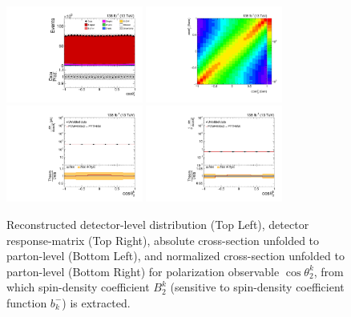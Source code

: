 \clearpage
\begin{figure}[htb]
\begin{center}
 \includegraphics[width=0.40\textwidth]{fig_fullRun2UL/controlplots/combined/Hyp_LeptonBk.pdf}
 \includegraphics[width=0.40\textwidth]{fig_fullRun2UL/unfolding/combined/ResponseMatrix_b2k.pdf} \\
 \includegraphics[width=0.40\textwidth]{fig_fullRun2UL/unfolding/combined/UnfoldedResults_b2k.pdf}
 \includegraphics[width=0.40\textwidth]{fig_fullRun2UL/unfolding/combined/UnfoldedResultsNorm_b2k.pdf} \\
\label{fig:b2k}
\caption{Reconstructed detector-level distribution (Top Left), detector response-matrix (Top Right), absolute cross-section unfolded to parton-level (Bottom Left), and normalized cross-section unfolded to parton-level (Bottom Right) for polarization observable $\cos\theta_{2}^{k}$, from which spin-density coefficient $B_{2}^{k}$ (sensitive to spin-density coefficient function $b_k^{-}$) is extracted.}
\end{center}
\end{figure}
